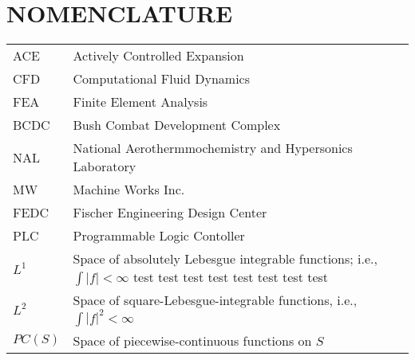 %
% 
%


\chapter*{NOMENCLATURE}

\hspace*{-1.25in}
\vspace{-18pt}
\begin{spacing}{1.0}
    \begin{longtable}[htbp]{@{}p{} p{}@{}}
		ACE	& Actively Controlled Expansion\\	[2ex]
		CFD	& Computational Fluid Dynamics\\	[2ex] %
		FEA & Finite Element Analysis\\	[2ex]
		BCDC & Bush Combat Development Complex\\ [2ex]
		NAL & National Aerothermmochemistry and Hypersonics Laboratory\\ [2ex]
		MW & Machine Works Inc.\\ [2ex]
		FEDC & Fischer Engineering Design Center\\ [2ex]
        PLC & Programmable Logic Contoller\\ [2ex]
		$L^1$ & Space of absolutely Lebesgue integrable functions; i.e., $\int |f| < \infty$ test test test test test test test test\\ [2ex]
		$L^2$ & Space of square-Lebesgue-integrable functions, i.e., $\int |f|^2 < \infty$\\ [2ex]
		$PC(S)$ & Space of piecewise-continuous functions on $S$\\ [2ex]
	\end{longtable}
\end{spacing}

\pagebreak{}
